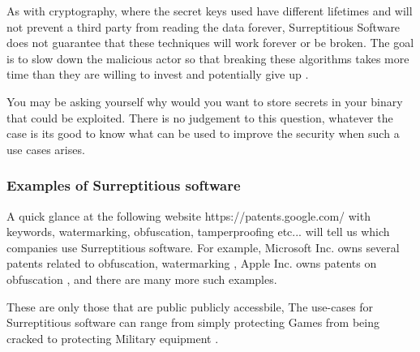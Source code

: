 As with cryptography, where the secret keys used have different lifetimes and will not prevent a third party from reading the data forever,
Surreptitious Software does not guarantee that these techniques will work forever or be broken. 
The goal is to slow down the malicious actor so that breaking these algorithms takes more time than they are willing to invest and potentially give up \cite{serr-soft}.

You may be asking yourself why would you want to store secrets in your binary that could be exploited. There is no
judgement to this question, whatever the case is its good to know what can be used to improve the security when such
a use cases arises.

\subsubsection{Examples of Surreptitious software}

A quick glance at the following website https://patents.google.com/ with keywords, watermarking, obfuscation, tamperproofing etc... will tell us which companies use Surreptitious software.
For example, Microsoft Inc. owns several patents related to obfuscation, watermarking \cite{ms-patent01},
Apple Inc. owns patents on obfuscation \cite{apple-patent01}, and there are many more such examples.

These are only those that are public publicly accessbile, The use-cases for Surreptitious software can range from simply
protecting Games from being cracked to protecting Military equipment \cite{serr-soft}.







